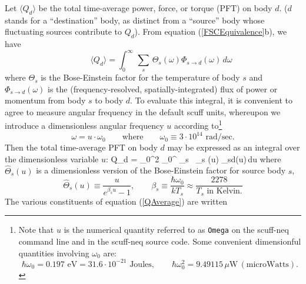 \documentclass[letterpaper]{article}
\newcommand{\wh}{\widehat}
\begin{document}
Let $\big\langle Q_d\big\rangle$ be the total time-average 
power, force, or torque (PFT) on body $d$. ($d$ stands for a 
``destination'' body, as distinct from a ``source'' body
whose fluctuating sources contribute to $Q_d$). From 
equation (\ref{FSCEquivalence}b), we have
\begin{equation}
 \qquad \big\langle Q_d\big\rangle
 = \int_0^\infty \, \sum_s \, \Theta_s(\omega) 
   \Phi_{s\to d}(\omega)\,d\omega
\end{equation}
where $\Theta_s$ is the Bose-Einstein factor for the temperature 
of body $s$ and $\Phi_{s \to d}(\omega)$ is the 
(frequency-resolved, spatially-integrated) flux of power or momentum
from body $s$ to body $d$.
To evaluate this integral, it is convenient to agree to measure angular
frequency in the default {\sc scuff} units, whereupon we 
introduce a dimensionless angular frequency $u$ according 
to\footnote{Note that $u$ is the numerical quantity referred to as 
\texttt{Omega} on the {\sc scuff-neq} command line and in the 
{\sc scuff-neq} source code. Some convenient
dimensionful quantities involving $\omega_0$ are:
$$
 \hbar\omega_0=0.197\text{ eV}=31.6\cdot10^{-21} \text{ Joules}, 
 \qquad 
 \hbar\omega_0^2=9.49115\,\mu\text{W} \, (\text{microWatts}).
$$}
$$ \omega=u\cdot \omega_0
   \qquad \text{where} \qquad
   \omega_0\equiv 3\cdot 10^{14}\text{ rad/sec}.
$$
Then the total time-average PFT on body $d$ may be
expressed as an integral over the dimensionless variable $u$:
{
 \qquad \big\langle Q_d\big\rangle
 = \hbar \omega_0^2
   \int_0^\infty 
              \sum_s \, \wh \Theta_s (u) \Phi{}_{s\to d}(u)\,du
}
where $\wh \Theta_s(u)$ is a dimensionless version 
of the Bose-Einstein factor for source body $s$,
$$ \wh \Theta_s(u)\equiv \frac{u}{e^{\beta_s u}-1}, 
   \qquad 
   \beta_s \equiv \frac{\hbar \omega_0}{kT_s}
    \approx \frac{ 2278 }{T_s\text{ in Kelvin.}}
$$
The various constituents of equation (\ref{QAverage}) are written
\end{document}
